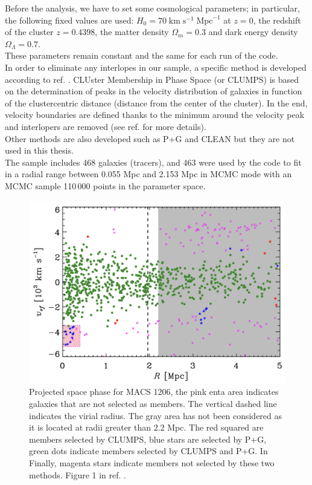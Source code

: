 Before the analysis, we have to set some cosmological parameters; in particular, the following fixed values are used: $H_0 = 70 \; \text{km} \; \text{s}^{-1} \; \text{Mpc}^{-1}$ at $z = 0$, the redshift of the cluster $z = 0.4398$, the matter density $\Omega_m = 0.3$ and dark energy density $\Omega_\Lambda = 0.7$.\\
These parameters remain constant and the same for each run of the code.\\
In order to eliminate any interlopes in our sample, a specific method is developed according to ref. \cite{CLASH-VLT:-The-Inner-Slope-of-the-MACS-J1206.2-0847-Dark-Matter-Density-Profile}. CLUster Membership in Phase Space (or CLUMPS) is based on the determination of peaks in the velocity distribution of galaxies in function of the clustercentric distance (distance from the center of the cluster). In the end, velocity boundaries are defined thanks to the minimum around the velocity peak and interlopers are removed (see ref. \cite{Biviano_CLUMPS} for more details).\\ Other methods are also developed such as P+G and CLEAN but they are not used in this thesis.\\
The sample includes 468 galaxies (tracers), and 463 were used by the code to fit in a radial range between 0.055 Mpc and 2.153 Mpc in MCMC mode with an MCMC sample 110\,000 points in the parameter space.\\
\begin{figure}[h!]
    \centering
    \includegraphics[width=0.6\linewidth]{Images/Chapter4/projected space phase.png}
    \caption[Projected space phase for MACS 1206]{Projected space phase for MACS 1206, the pink enta area indicates galaxies that are not selected as members. The vertical dashed line indicates the virial radius. The gray area has not been considered as it is located at radii greater than 2.2 Mpc. The red squared are members selected by CLUMPS, blue stars are selected by P+G, green dots indicate members selected by CLUMPS and P+G. In Finally, magenta stars indicate members not selected by these two methods. Figure 1 in ref. \cite{CLASH-VLT:-The-Inner-Slope-of-the-MACS-J1206.2-0847-Dark-Matter-Density-Profile}.}
    \label{fig:projected space phase}
\end{figure}\\

